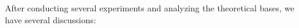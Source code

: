 After conducting several experiments and analyzing the theoretical bases, we have several discussions:
